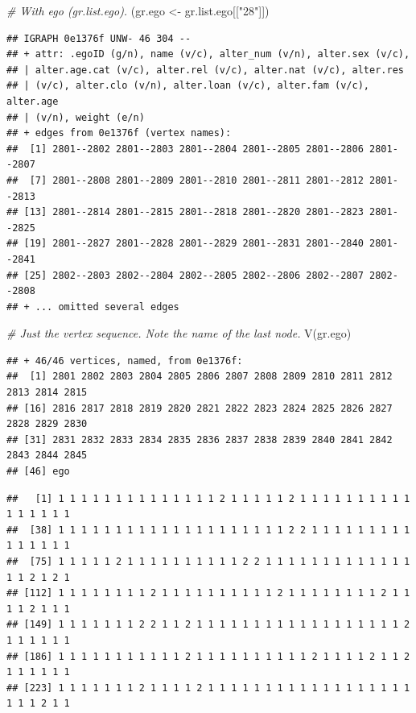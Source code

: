 \documentclass[
]{book}
\newenvironment{Shaded}{\begin{snugshade}}{\end{snugshade}}
\newcommand{\CommentTok}[1]{\textcolor[rgb]{0.56,0.35,0.01}{\textit{#1}}}
\newcommand{\FunctionTok}[1]{\textcolor[rgb]{0.00,0.00,0.00}{#1}}
\newcommand{\NormalTok}[1]{#1}
\newcommand{\OtherTok}[1]{\textcolor[rgb]{0.56,0.35,0.01}{#1}}
\newcommand{\SpecialCharTok}[1]{\textcolor[rgb]{0.00,0.00,0.00}{#1}}
\newcommand{\StringTok}[1]{\textcolor[rgb]{0.31,0.60,0.02}{#1}}
\begin{document}
\begin{Shaded}
\begin{Highlighting}[]
\CommentTok{\# With ego (gr.list.ego). }
\NormalTok{(gr.ego }\OtherTok{\textless{}{-}}\NormalTok{ gr.list.ego[[}\StringTok{"28"}\NormalTok{]])}
\end{Highlighting}
\end{Shaded}

\begin{verbatim}
## IGRAPH 0e1376f UNW- 46 304 -- 
## + attr: .egoID (g/n), name (v/c), alter_num (v/n), alter.sex (v/c),
## | alter.age.cat (v/c), alter.rel (v/c), alter.nat (v/c), alter.res
## | (v/c), alter.clo (v/n), alter.loan (v/c), alter.fam (v/c), alter.age
## | (v/n), weight (e/n)
## + edges from 0e1376f (vertex names):
##  [1] 2801--2802 2801--2803 2801--2804 2801--2805 2801--2806 2801--2807
##  [7] 2801--2808 2801--2809 2801--2810 2801--2811 2801--2812 2801--2813
## [13] 2801--2814 2801--2815 2801--2818 2801--2820 2801--2823 2801--2825
## [19] 2801--2827 2801--2828 2801--2829 2801--2831 2801--2840 2801--2841
## [25] 2802--2803 2802--2804 2802--2805 2802--2806 2802--2807 2802--2808
## + ... omitted several edges
\end{verbatim}

\begin{Shaded}
\begin{Highlighting}[]
\CommentTok{\# Just the vertex sequence. Note the name of the last node.}
\FunctionTok{V}\NormalTok{(gr.ego)}
\end{Highlighting}
\end{Shaded}

\begin{verbatim}
## + 46/46 vertices, named, from 0e1376f:
##  [1] 2801 2802 2803 2804 2805 2806 2807 2808 2809 2810 2811 2812 2813 2814 2815
## [16] 2816 2817 2818 2819 2820 2821 2822 2823 2824 2825 2826 2827 2828 2829 2830
## [31] 2831 2832 2833 2834 2835 2836 2837 2838 2839 2840 2841 2842 2843 2844 2845
## [46] ego
\end{verbatim}

\begin{Shaded}
\end{Shaded}

\begin{verbatim}
##   [1] 1 1 1 1 1 1 1 1 1 1 1 1 1 1 2 1 1 1 1 1 2 1 1 1 1 1 1 1 1 1 1 1 1 1 1 1 1
##  [38] 1 1 1 1 1 1 1 1 1 1 1 1 1 1 1 1 1 1 1 1 2 2 1 1 1 1 1 1 1 1 1 1 1 1 1 1 1
##  [75] 1 1 1 1 1 2 1 1 1 1 1 1 1 1 1 1 2 2 1 1 1 1 1 1 1 1 1 1 1 1 1 1 1 2 1 2 1
## [112] 1 1 1 1 1 1 1 1 2 1 1 1 1 1 1 1 1 1 1 2 1 1 1 1 1 1 1 1 2 1 1 1 1 2 1 1 1
## [149] 1 1 1 1 1 1 1 2 2 1 1 2 1 1 1 1 1 1 1 1 1 1 1 1 1 1 1 1 1 1 2 1 1 1 1 1 1
## [186] 1 1 1 1 1 1 1 1 1 1 1 2 1 1 1 1 1 1 1 1 1 1 2 1 1 1 1 2 1 1 2 1 1 1 1 1 1
## [223] 1 1 1 1 1 1 1 2 1 1 1 1 2 1 1 1 1 1 1 1 1 1 1 1 1 1 1 1 1 1 1 1 1 1 2 1 1
\end{verbatim}
\end{document}
